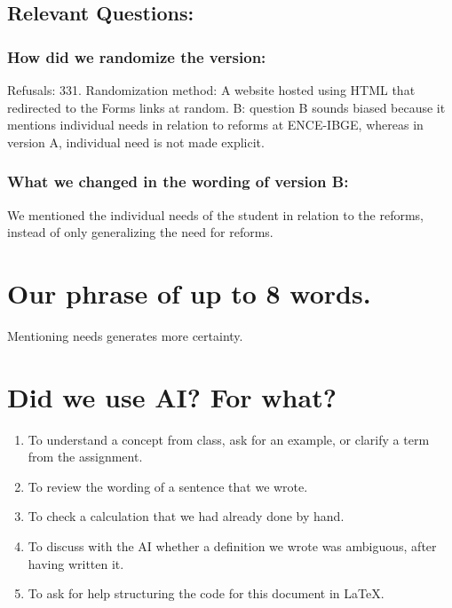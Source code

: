 \documentclass[12pt]{article}
\begin{document}
\subsection{Relevant Questions:}

    \subsubsection{How did we randomize the version:}

    Refusals: 331. Randomization method: A website hosted using HTML that redirected to the Forms links at random.
B: question B sounds biased because it mentions individual needs in relation to reforms at ENCE-IBGE, whereas in version A, individual need is not made explicit.
    
    \subsubsection{What we changed in the wording of version B:}
    
We mentioned the individual needs of the student in relation to the reforms, instead of only generalizing the need for reforms.

\section{Our phrase of up to 8 words.}

Mentioning needs generates more certainty.

\begin{center}
\vfill
\thepage
\end{center}
\newpage

\section{Did we use AI? For what?}

\begin{enumerate}
    \item To understand a concept from class, ask for an example, or clarify a term from the assignment.
    \item To review the wording of a sentence that we wrote.
    \item To check a calculation that we had already done by hand.
    \item To discuss with the AI whether a definition we wrote was ambiguous, after having written it.
    \item To ask for help structuring the code for this document in LaTeX.
\end{enumerate}
\end{document}
